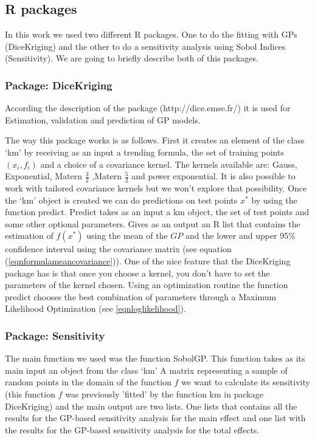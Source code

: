 \documentclass[12pt]{book}
\begin{document}
\subsection{R packages}
In this work we used two different R packages. One to do the fitting with GPs (DiceKriging) and the other to do 
a sensitivity analysis using Sobol Indices (Sensitivity). We are going to briefly describe both of this packages.

\subsubsection{Package: DiceKriging}
According the description of the package (http://dice.emse.fr/) it is used for Estimation, validation and 
prediction of GP models.

The way this package works is as follows. First it creates an element of the class `km' by receiving 
as an input a trending formula, the set of training points $(x_{i},f_{i})$ and a choice 
of a covariance kernel. The kernels available are: Gauss, Exponential, Matern $\frac{3}{2}$
,Matern $\frac{5}{2}$ and power exponential. It is also possible to work with tailored covariance
kernels but we won't explore that possibility. Once the `km' object is created we can do 
predictions on test points $x^{*}$ 
by using the function predict. Predict takes as an input a km object, the set of test points and 
some other optional parameters. Gives as an output an R list that contains the estimation of $f(x^{*})$
using the mean of the $GP$ and the lower and upper 95\% confidence interval using the 
covariance matrix (see equation (\ref{eqnformulameancovariance})).
One of the nice feature that the DiceKriging package has is that once you choose a kernel, you don't
have to set the parameters of the kernel chosen. Using an optimization routine the function
predict chooses the best combination
of parameters through a Maximum Likelihood Optimization \cite{dupuy2015dicedesign} (see \ref{eqnloglikelihood}).


\subsubsection{Package: Sensitivity}
The main function we used was the function SobolGP. This function takes as its main   input an object 
from the class `km' A matrix representing a sample of random points in the domain of the function $f$
we want to calculate its sensitivity (this function $f$ was previously 'fitted' by the function
km in package DiceKriging) and the main output are two lists. One lists that contains 
all the results for the GP-based sensitivity analysis for the main effect and one list with the 
results for the GP-based sensitivity analysis for the total effects.
\end{document}
